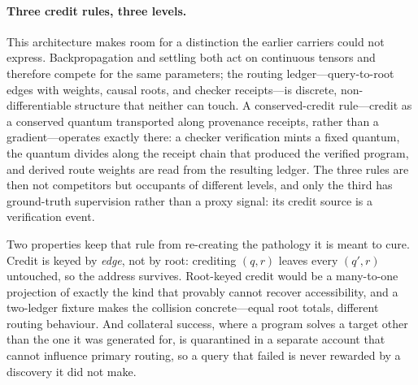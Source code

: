 \documentclass[11pt]{article}
\begin{document}
\paragraph{Three credit rules, three levels.}
This architecture makes room for a distinction the earlier carriers could not express.
Backpropagation and settling both act on continuous tensors and therefore compete for the
same parameters; the routing ledger---query-to-root edges with weights, causal roots, and
checker receipts---is discrete, non-differentiable structure that neither can touch. A
conserved-credit rule---credit as a conserved quantum transported along provenance
receipts, rather than a gradient---operates exactly
there: a checker verification mints a fixed quantum, the quantum divides along the receipt
chain that produced the verified program, and derived route weights are read from the
resulting ledger. The three rules are then not competitors but occupants of different
levels, and only the third has ground-truth supervision rather than a proxy signal: its
credit source is a verification event.

Two properties keep that rule from re-creating the pathology it is meant to cure. Credit
is keyed by \emph{edge}, not by root: crediting $(q,r)$ leaves every $(q',r)$ untouched,
so the address survives. Root-keyed credit would be a many-to-one projection of exactly
the kind that provably cannot recover accessibility, and a two-ledger fixture makes the
collision concrete---equal root totals, different routing behaviour. And collateral
success, where a program solves a target other than the one it was generated for, is
quarantined in a separate account that cannot influence primary routing, so a query that
failed is never rewarded by a discovery it did not make.
\end{document}
